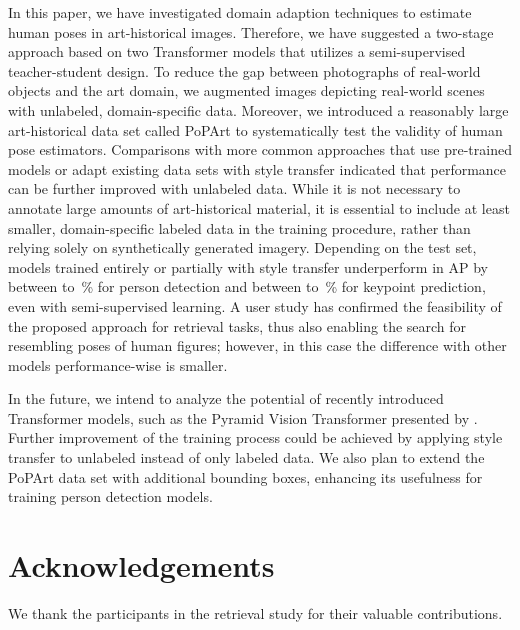 \documentclass[sigconf]{acmart}
\begin{document}
In this paper, we have investigated domain adaption techniques to estimate human poses in art-historical images. 
Therefore, we have suggested a two-stage approach based on two Transformer models that utilizes a semi-supervised teacher-student design. 
To reduce the gap between photographs of real-world objects and the art domain, we augmented images depicting real-world scenes with unlabeled, domain-specific data. 
Moreover, we introduced a reasonably large art-historical data set called \acf{PoPArt} to systematically test the validity of human pose estimators. 
Comparisons with more common approaches that use pre-trained models or adapt existing data sets with style transfer indicated that performance can be further improved with unlabeled data. 
While it is not necessary to annotate large amounts of art-historical material, it is essential to include at least smaller, domain-specific labeled data in the training procedure, rather than relying solely on synthetically generated imagery. 
Depending on the test set, models trained entirely or partially with style transfer underperform in \acl{AP} by between  to \,\% for person detection and between  to \,\% for keypoint prediction, even with semi-supervised learning. 
A user study has confirmed the feasibility of the proposed approach for retrieval tasks, thus also enabling the search for resembling poses of human figures; however, in this case the difference with other models performance-wise is smaller.

In the future, we intend to analyze the potential of recently introduced Transformer models, such as the Pyramid Vision Transformer presented by \citet{DBLP:journals/corr/abs-2106-13797}. Further improvement of the training process could be achieved by applying style transfer to unlabeled instead of only labeled data. We also plan to extend the \ac{PoPArt} data set with additional bounding boxes, enhancing its usefulness for training person detection models.


\section*{Acknowledgements}

We thank the participants in the retrieval study for their valuable contributions.


\clearpage

\balance

\balance

\clearpage
\onecolumn
\setcounter{section}{0}

\renewcommand\thesection{\Alph{section}}
\end{document}
